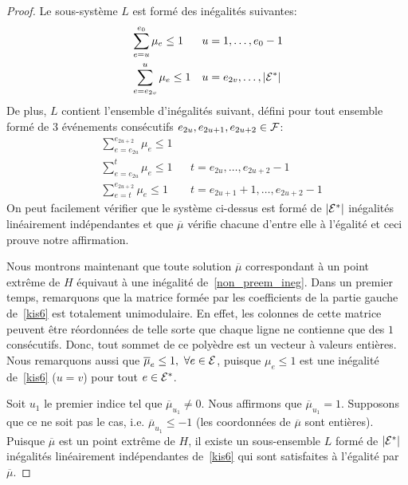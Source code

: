 \begin{proof}
  Le sous-système $L$ est formé des inégalités suivantes: 
  \begin{align*}
    & \sum_{e=u}^{e_0} \mu_e \le 1 & & u=1,\dots, e_0-1\\
    & \sum_{e=e_{2v}}^u \mu_e \le 1& & u=e_{2v},\dots,|{\cal E}^*|
  \end{align*}
  De plus, $L$ contient l'ensemble d'inégalités suivant, défini pour
  tout ensemble formé de 3 événements consécutifs
  $e_{2u},e_{2u+1},e_{2u+2} \in \cal F$:   
  \begin{align*}
    & \sum_{e=e_{2u}}^{e_{2u+2}} \mu_e \le 1 & & \\
    & \sum_{e=e_{2u}}^t \mu_e \le 1& & t=e_{2u},\dots,e_{2u+2}-1\\
    & \sum_{e=t}^{e_{2u+2}} \mu_e \le 1& & t=e_{2u+1}+1,\dots,e_{2u+2}-1
  \end{align*} 
  On peut facilement vérifier que le système ci-dessus est formé de
  $|{\cal E}^*|$ inégalités linéairement indépendantes et que
  $\overline{\mu}$ vérifie chacune d'entre elle à l'égalité et ceci
  prouve notre affirmation. 

  Nous montrons maintenant que toute solution $\overline{\mu}$
  correspondant à un point extrême de $H$ équivaut à une inégalité
  de~\eqref{non_preem_ineg}. Dans un premier temps, remarquons que la
  matrice formée par les coefficients de la partie gauche
  de~\eqref{kis6} est totalement unimodulaire. En effet, les colonnes
  de cette matrice peuvent être réordonnées de telle sorte que chaque
  ligne ne contienne que des $1$ consécutifs. Donc, tout sommet de
  ce polyèdre est un vecteur à valeurs entières. Nous remarquons aussi
  que $\overline{\mu}_e\le 1,\ \forall e \in {\cal E}$, puisque $\mu_e \le 1$
  est une inégalité de~\eqref{kis6} ($u=v$) pour tout $e \in {\cal E}^*$.
  
  Soit $u_1$ le premier indice tel que $\overline{\mu}_{u_1} \neq 0$. Nous
  affirmons que $\overline{\mu}_{u_1}=1$. Supposons que ce ne soit pas
  le cas, i.e. $\overline{\mu}_{u_1} \le -1$ (les coordonnées de
  $\overline{\mu}$ sont entières). Puisque $\overline{\mu}$ est un point
  extrême de $H$, il existe un sous-ensemble $L$ formé de $|{\cal E}^*|$
  inégalités linéairement indépendantes de~\eqref{kis6} qui sont
  satisfaites à l'égalité par $\overline{\mu}$. 


\end{proof}

